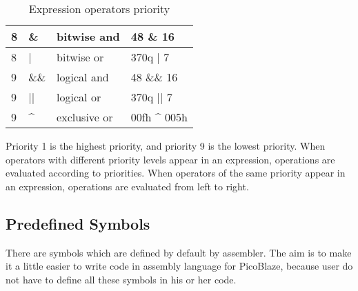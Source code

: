 \begin{table}[h!]
\begin{tabular}{|l|l|l|l|}
                8        & \&       & bitwise and             & 48 \& 16        \\\hline
                8        & |        & bitwise or              & 370q | 7        \\\hline
                9        & \&\&     & logical and             & 48 \&\& 16      \\\hline
                9        & ||       & logical or              & 370q || 7       \\\hline
                9        & \^{}     & exclusive or            & 00fh \^{} 005h  \\\hline
            \end{tabular}

            \caption{Expression operators priority}
        \end{table}

        Priority 1 is the highest priority, and priority 9 is the lowest priority. When operators with different priority levels appear in an expression, operations are evaluated according to priorities. When operators of the same priority appear in an expression, operations are evaluated from left to right.

    \subsection{Predefined Symbols}
        There are symbols which are defined by default by assembler. The aim is to make it a little easier to write code in assembly language for PicoBlaze, because user do not have to define all these symbols in his or her code.

